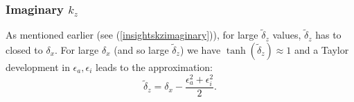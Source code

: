 \subsubsection{Imaginary $k_z$}
As mentioned earlier (see (\ref{insightskzimaginary})), for large $\widetilde{\delta}_z$ values, $\widetilde{\delta}_z$ has to closed to $\delta_x$.
For large $\delta_x$ (and so large $\widetilde{\delta}_z$) we have $\tanh(\widetilde{\delta}_z)\approx 1$ and a Taylor development in $\epsilon_a, \epsilon_i$  leads to the approximation:
\[
\widetilde{\delta}_z=\delta_x-\frac{\epsilon_a^2+\epsilon_i^2}{2}.
\]
%
